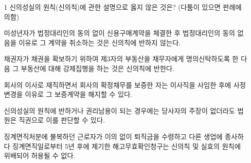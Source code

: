 \begin{question}{1}
신의성실의 원칙(신의칙)에 관한 설명으로 옳지 않은 것은? (다툼이 있으면 판례에 의함)
\begin{choices}
  \item 미성년자가 법정대리인의 동의 없이 신용구매계약을 체결한 후 법정대리인의 동의 없음을 이유로 그 계약을 취소하는 것은 신의칙에 반하지 않는다.
  \item 채권자가 채권을 확보하기 위하여 제3자의 부동산을 채무자에게 명의신탁하도록 한 다음 그 부동산에 대해 강제집행을 하는 것은 신의칙에 반한다.
  \item 회사의 이사로 재직하면서 회사의 확정채무를 보증한 자는 이사직을 사임한 후에 사정변경을 이유로 그 보증계약을 해지할 수 있다.
  \item 신의성실의 원칙에 반하거나 권리남용이 되는 경우에는 당사자의 주장이 없더라도 법원은 직권으로 이를 판단할 수 있다.
  \item 징계면직처분에 불복하던 근로자가 이의 없이 퇴직금을 수령하고 다른 생업에 종사하다 징계면직일로부터 5년 후에 제기한 해고무효확인청구는 신의칙 및 실효의 원칙에 위배되어 허용될 수 없다.
\end{choices}
\end{question}
